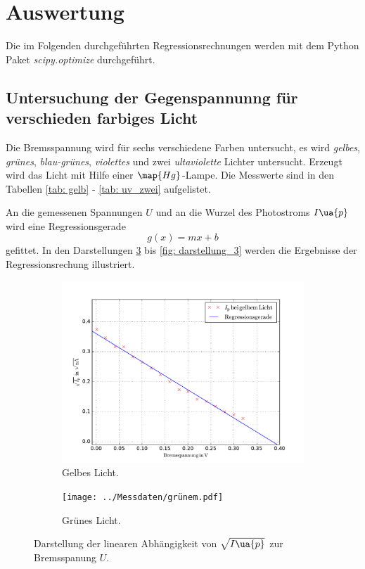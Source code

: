 \section{Auswertung}

Die im Folgenden durchgeführten Regressionsrechnungen werden mit dem
Python Paket \emph{scipy.optimize}\cite{scipy} durchgeführt.

\subsection{Untersuchung der Gegenspannunng für verschieden farbiges Licht}
Die Bremsspannung wird für sechs verschiedene Farben untersucht, es wird
\emph{gelbes}, \emph{grünes}, \emph{blau-grünes}, \emph{violettes} und zwei \emph{ultaviolette}
Lichter untersucht. Erzeugt wird das Licht mit Hilfe einer $\map{Hg}$-Lampe.
Die Messwerte sind in den Tabellen \ref{tab: gelb} - \ref{tab: uv_zwei} aufgelistet.






An die gemessenen Spannungen $U$ und an die Wurzel des Photostroms $I\ua{p}$ wird eine
Regressionsgerade
\begin{equation}
  \label{eq:reg}
  g(x)=mx+b
\end{equation}
gefittet.
In den Darstellungen \ref{fig: darstellung_1} bis \ref{fig: darstellung_3} werden die Ergebnisse der Regressionsrechung
illustriert.
\begin{figure}
  \centering
  \begin{subfigure}{0.48\textwidth}
    \centering
    \includegraphics[width=1 \textwidth]{../Messdaten/gelbem.pdf}
    \caption{Gelbes Licht.}
    \label{fig: gelb}
  \end{subfigure}
  \begin{subfigure}{0.48\textwidth}
    \centering
    \texttt{[image: ../Messdaten/grünem.pdf]}
    \caption{Grünes Licht.}
    \label{fig: grün}
  \end{subfigure}
  \caption{Darstellung der linearen Abhängigkeit von $\sqrt{I\ua{p}}$ zur Bremsspanung $U$.}
  \label{fig: darstellung_1}
\end{figure}
